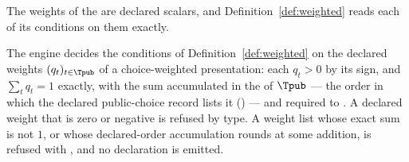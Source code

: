 
The weights of the  are declared scalars, and
Definition~\ref{def:weighted} reads each of its conditions on them exactly.

\begin{requirement}\label{req:weight-list}
The engine decides the conditions of Definition~\ref{def:weighted} on the
declared weights $(q_t)_{t\in\Tpub}$ of a choice-weighted presentation: each
$q_t>0$ by its sign, and $\sum_tq_t=1$ exactly, with the sum accumulated in
the  of $\Tpub$ --- the order in which the declared
public-choice record lists it () --- and
required to . A declared weight that is
zero or negative is refused by type. A weight list whose exact sum is not $1$,
or whose declared-order accumulation rounds at some addition, is refused with
, and no declaration is emitted.
\end{requirement}
